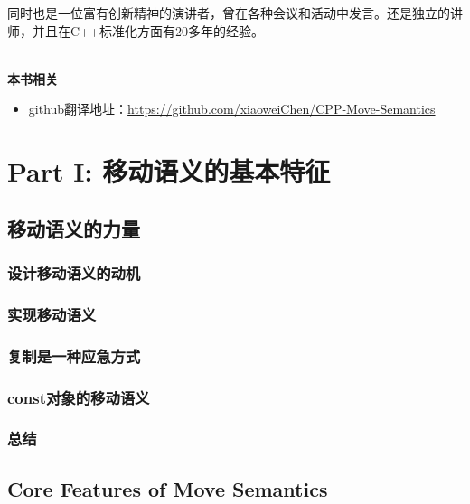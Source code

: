 \documentclass[11pt,a4paper,UTF8]{ctexart}
\begin{document}
	同时也是一位富有创新精神的演讲者，曾在各种会议和活动中发言。还是独立的讲师，并且在C++标准化方面有20多年的经验。\par
	
	\hspace*{\fill} \\ %
	\noindent\textbf{本书相关}\ \par
	\begin{itemize}
		\item github翻译地址：\href{https://github.com/xiaoweiChen/CPP-Move-Semantics}{https://github.com/xiaoweiChen/CPP-Move-Semantics}
	\end{itemize}
	\newpage
	
	\tableofcontents
	\newpage
	
	\pagestyle{empty}
	
	

	\section{Part I: 移动语义的基本特征}
	
	\subsection{移动语义的力量}
	
		\subsubsection{设计移动语义的动机}
		
		\subsubsection{实现移动语义}
		
		\subsubsection{复制是一种应急方式}
		
		\subsubsection{const对象的移动语义}
		
		\subsubsection{总结}
		
	\subsection{Core Features of Move Semantics}
\end{document}
